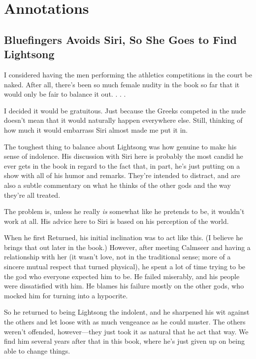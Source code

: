 \section*{Annotations}

\subsection*{Bluefingers Avoids Siri, So She Goes to Find Lightsong}

I considered having the men performing the athletics competitions in the court be naked. After all, there’s been so much female nudity in the book so far that it would only be fair to balance it out. . . .

I decided it would be gratuitous. Just because the Greeks competed in the nude doesn’t mean that it would naturally happen everywhere else. Still, thinking of how much it would embarrass Siri almost made me put it in.

The toughest thing to balance about Lightsong was how genuine to make his sense of indolence. His discussion with Siri here is probably the most candid he ever gets in the book in regard to the fact that, in part, he’s just putting on a show with all of his humor and remarks. They’re intended to distract, and are also a subtle commentary on what he thinks of the other gods and the way they’re all treated.

The problem is, unless he really \textit{is} somewhat like he pretends to be, it wouldn’t work at all. His advice here to Siri is based on his perception of the world.

When he first Returned, his initial inclination was to act like this. (I believe he brings that out later in the book.) However, after meeting Calmseer and having a relationship with her (it wasn’t love, not in the traditional sense; more of a sincere mutual respect that turned physical), he spent a lot of time trying to be the god who everyone expected him to be. He failed miserably, and his people were dissatisfied with him. He blames his failure mostly on the other gods, who mocked him for turning into a hypocrite.

So he returned to being Lightsong the indolent, and he sharpened his wit against the others and let loose with as much vengeance as he could muster. The others weren’t offended, however—they just took it as natural that he act that way. We find him several years after that in this book, where he’s just given up on being able to change things.



